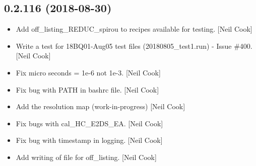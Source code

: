\documentclass[a4paper,10pt,english]{report}
\begin{document}
\subsection{0.2.116 (2018-08-30)}
\label{\detokenize{misc/changelog:id343}}\begin{itemize}
\item {} 
Add off\_listing\_REDUC\_spirou to recipes available for testing. {[}Neil
Cook{]}

\item {} 
Write a test for 18BQ01-Aug05 test files (20180805\_test1.run) - Issue
\#400. {[}Neil Cook{]}

\item {} 
Fix micro seconds = 1e-6 not 1e-3. {[}Neil Cook{]}

\item {} 
Fix bug with PATH in bashrc file. {[}Neil Cook{]}

\item {} 
Add the resolution map (work-in-progress) {[}Neil Cook{]}

\item {} 
Fix bugs with cal\_HC\_E2DS\_EA. {[}Neil Cook{]}

\item {} 
Fix bug with timestamp in logging. {[}Neil Cook{]}

\item {} 
Add writing of file for off\_listing. {[}Neil Cook{]}

\end{itemize}
\end{document}
